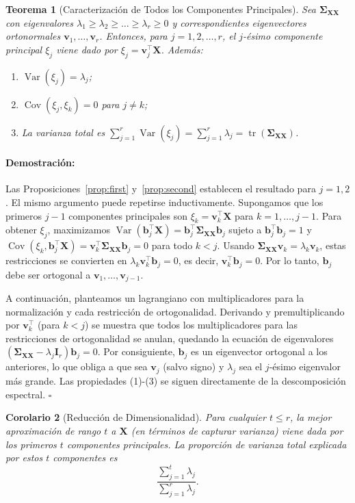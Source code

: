 \documentclass[11pt]{article}
\theoremstyle{plain}
\newtheorem{theorem}{Teorema}[section]
\newtheorem{corollary}[theorem]{Corolario}
\newenvironment{proof}{\paragraph{Demostración:}}{\hfill$\square$}
\newcommand{\X}{\mathbf{X}}
\newcommand{\bff}{\mathbf{b}}
\newcommand{\bfv}{\mathbf{v}}
\newcommand{\bfI}{\mathbf{I}}
\newcommand{\bfSigma}{\boldsymbol{\Sigma}}
\newcommand{\Var}{\operatorname{Var}}
\newcommand{\Cov}{\operatorname{Cov}}
\newcommand{\tr}{\operatorname{tr}}
\begin{document}
\begin{theorem}[Caracterización de Todos los Componentes Principales]
\label{thm:pca}
Sea \(\bfSigma_{\X\X}\) con eigenvalores \(\lambda_1 \ge \lambda_2 \ge \dots \ge \lambda_r \ge 0\) y correspondientes eigenvectores ortonormales \(\bfv_1, \dots, \bfv_r\). Entonces, para \(j = 1, 2, \dots, r\), el \(j\)-ésimo componente principal \(\xi_j\) viene dado por \(\xi_j = \bfv_j^\top \X\). Además:
\begin{enumerate}
    \item \(\Var(\xi_j) = \lambda_j\);
    \item \(\Cov(\xi_j, \xi_k) = 0\) para \(j \ne k\);
    \item La varianza total es \(\sum_{j=1}^r \Var(\xi_j) = \sum_{j=1}^r \lambda_j = \tr(\bfSigma_{\X\X})\).
\end{enumerate}
\end{theorem}

\begin{proof}
Las Proposiciones~\ref{prop:first} y~\ref{prop:second} establecen el resultado para \(j = 1, 2\). El mismo argumento puede repetirse inductivamente. Supongamos que los primeros \(j-1\) componentes principales son \(\xi_k = \bfv_k^\top \X\) para \(k = 1, \dots, j-1\). Para obtener \(\xi_j\), maximizamos \(\Var(\bff_j^\top \X) = \bff_j^\top \bfSigma_{\X\X} \bff_j\) sujeto a \(\bff_j^\top \bff_j = 1\) y \(\Cov(\xi_k, \bff_j^\top \X) = \bfv_k^\top \bfSigma_{\X\X} \bff_j = 0\) para todo \(k < j\). Usando \(\bfSigma_{\X\X} \bfv_k = \lambda_k \bfv_k\), estas restricciones se convierten en \(\lambda_k \bfv_k^\top \bff_j = 0\), es decir, \(\bfv_k^\top \bff_j = 0\). Por lo tanto, \(\bff_j\) debe ser ortogonal a \(\bfv_1, \dots, \bfv_{j-1}\).

A continuación, planteamos un lagrangiano con multiplicadores para la normalización y cada restricción de ortogonalidad. Derivando y premultiplicando por \(\bfv_k^\top\) (para \(k < j\)) se muestra que todos los multiplicadores para las restricciones de ortogonalidad se anulan, quedando la ecuación de eigenvalores \((\bfSigma_{\X\X} - \lambda_j \bfI_r) \bff_j = 0\). Por consiguiente, \(\bff_j\) es un eigenvector ortogonal a los anteriores, lo que obliga a que sea \(\bfv_j\) (salvo signo) y \(\lambda_j\) sea el \(j\)-ésimo eigenvalor más grande. Las propiedades (1)-(3) se siguen directamente de la descomposición espectral.
\end{proof}

\begin{corollary}[Reducción de Dimensionalidad]
\label{cor:reduction}
Para cualquier \(t \le r\), la mejor aproximación de rango \(t\) a \(\X\) (en términos de capturar varianza) viene dada por los primeros \(t\) componentes principales. La proporción de varianza total explicada por estos \(t\) componentes es
\[
\frac{\sum_{j=1}^t \lambda_j}{\sum_{j=1}^r \lambda_j}.
\]
\end{corollary}
\end{document}
